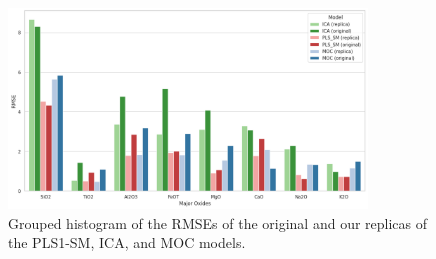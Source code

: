 \begin{figure}[ht]
	\centering
	\includegraphics[width=0.85\textwidth]{images/rmse_historgram.png}
	\caption{Grouped histogram of the RMSEs of the original and our replicas of the PLS1-SM, ICA, and MOC models.}
	\label{fig:rmse_histograms}
\end{figure}


